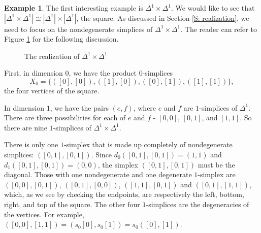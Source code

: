 \documentclass[12pt]{article}
\theoremstyle{plain}
\theoremstyle{definition}
\newtheorem{example}[theorem]{Example}
\begin{document}
\begin{example}
The first interesting example is $\Delta^1\times \Delta^1$. We would like to see that $|\Delta^1\times \Delta^1|\cong |\Delta^1|\times |\Delta^1|$, the square.  As discussed in Section \ref{S: realization}, we need to focus on the nondegenerate simplices of $\Delta^1\times \Delta^1$. The reader can refer to Figure \ref{F: fig21} for the following discussion.


\begin{figure}[!htp]
\begin{center}
\end{center}
\caption{The realization of  $\Delta^1\times \Delta^1$}\label{F: fig21}
\end{figure}

First, in dimension $0$, we have the product $0$-simplices $$X_0=\{([0],[0]),([1],[0]),([0],[1]),([1],[1])\},$$ the four vertices of the square. 

In dimension $1$, we have the pairs $(e,f)$, where $e$ and $f$ are $1$-simplices of $\Delta^1$. There are three possibilities for each of $e$ and $f$ - $[0,0]$, $[0,1]$, and $[1,1]$. So there are nine $1$-simplices of $\Delta^1\times \Delta^1$.

There is only one $1$-simplex that is made up completely of nondegenerate simplices: $([0,1],[0,1])$. Since $d_0([0,1],[0,1])=(1,1)$ and $d_1([0,1],[0,1])=(0,0)$, the simplex $([0,1],[0,1])$ must be the diagonal. Those with one nondegenerate and one degenerate $1$-simplex are  $([0,0],[0,1])$,  $([0,1],[0,0])$, $([1,1],[0,1])$ and $([0,1],[1,1])$, which, as we see by checking the endpoints, are respectively the left, bottom, right, and top of the square. The other four $1$-simplices are the degeneracies of the vertices. For example, $([0,0],[1,1])=(s_0[0],s_0[1])=s_0([0],[1])$.


\end{example}
\end{document}
